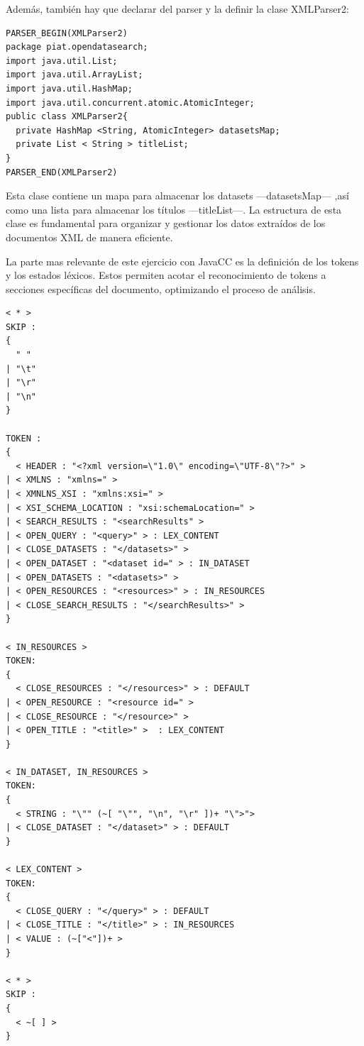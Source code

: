 Además, también hay que declarar del parser y la definir la clase XMLParser2:
\lstset{inputencoding=utf8/latin1}
\begin{lstlisting}
PARSER_BEGIN(XMLParser2)
package piat.opendatasearch;
import java.util.List;
import java.util.ArrayList;
import java.util.HashMap;
import java.util.concurrent.atomic.AtomicInteger;
public class XMLParser2{
  private HashMap <String, AtomicInteger> datasetsMap;
  private List < String > titleList;
}
PARSER_END(XMLParser2) 
\end{lstlisting}

Esta clase contiene un mapa para almacenar los datasets ---datasetsMap---%
,así como
una lista para almacenar los títulos ---titleList---. La estructura de esta clase es fundamental para organizar y gestionar los datos extraídos de los documentos XML de manera eficiente.

La parte mas relevante de este ejercicio con JavaCC es la definición de los tokens y los estados léxicos. Estos permiten acotar el reconocimiento de tokens a secciones específicas del documento, optimizando el proceso de análisis.

\lstset{inputencoding=utf8/latin1}
\begin{lstlisting}
< * >
SKIP :
{
  " " 
| "\t"
| "\r"
| "\n"
} 

TOKEN :
{
  < HEADER : "<?xml version=\"1.0\" encoding=\"UTF-8\"?>" > 
| < XMLNS : "xmlns=" > 
| < XMNLNS_XSI : "xmlns:xsi=" > 
| < XSI_SCHEMA_LOCATION : "xsi:schemaLocation=" > 
| < SEARCH_RESULTS : "<searchResults" >
| < OPEN_QUERY : "<query>" > : LEX_CONTENT
| < CLOSE_DATASETS : "</datasets>" > 
| < OPEN_DATASET : "<dataset id=" > : IN_DATASET
| < OPEN_DATASETS : "<datasets>" > 
| < OPEN_RESOURCES : "<resources>" > : IN_RESOURCES
| < CLOSE_SEARCH_RESULTS : "</searchResults>" >
}

< IN_RESOURCES >
TOKEN:
{
  < CLOSE_RESOURCES : "</resources>" > : DEFAULT
| < OPEN_RESOURCE : "<resource id=" > 
| < CLOSE_RESOURCE : "</resource>" > 
| < OPEN_TITLE : "<title>" >  : LEX_CONTENT
}

< IN_DATASET, IN_RESOURCES >
TOKEN:
{
  < STRING : "\"" (~[ "\"", "\n", "\r" ])+ "\">">
| < CLOSE_DATASET : "</dataset>" > : DEFAULT
}

< LEX_CONTENT >
TOKEN:
{
  < CLOSE_QUERY : "</query>" > : DEFAULT
| < CLOSE_TITLE : "</title>" > : IN_RESOURCES
| < VALUE : (~["<"])+ > 
}

< * >
SKIP :
{
  < ~[ ] >
}
\end{lstlisting}

